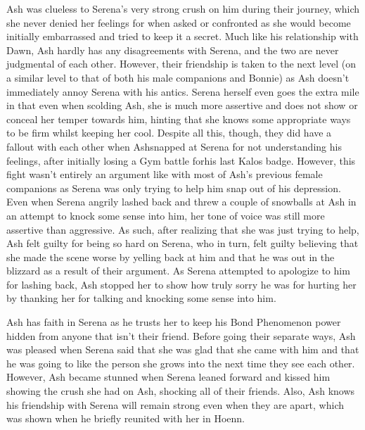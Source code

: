 \documentclass[a4paper,12pt]{article}
\begin{document}
Ash was clueless to Serena's very strong crush on him during their journey, which she never denied her feelings for when asked or confronted as she would become initially embarrassed and tried to keep it a secret. Much like his relationship with Dawn, Ash hardly has any disagreements with Serena, and the two are never judgmental of each other. However, their friendship is taken to the next level (on a similar level to that of both his male companions and Bonnie) as Ash doesn't immediately annoy Serena with his antics. Serena herself even goes the extra mile in that even when scolding Ash, she is much more assertive and does not show or conceal her temper towards him, hinting that she knows some appropriate ways to be firm whilst keeping her cool. Despite all this, though, they did have a fallout with each other when Ashsnapped at Serena for not understanding his feelings, after initially losing a Gym battle forhis last Kalos badge. However, this fight wasn't entirely an argument like with most of Ash's previous female companions as Serena was only trying to help him snap out of his depression. Even when Serena angrily lashed back and threw a couple of snowballs at Ash in an attempt to knock some sense into him, her tone of voice was still more assertive than aggressive. As such, after realizing that she was just trying to help, Ash felt guilty for being so hard on Serena, who in turn, felt guilty believing that she made the scene worse by yelling back at him and that he was out in the blizzard as a result of their argument. As Serena attempted to apologize to him for lashing back, Ash stopped her to show how truly sorry he was for hurting her by thanking her for talking and knocking some sense into him.\\ \par \vspace{0.5cm}

Ash has faith in Serena as he trusts her to keep his Bond Phenomenon power hidden from anyone that isn't their friend. Before going their separate ways, Ash was pleased when Serena said that she was glad that she came with him and that he was going to like the person she grows into the next time they see each other. However, Ash became stunned when Serena leaned forward and kissed him showing the crush she had on Ash, shocking all of their friends. Also, Ash knows his friendship with Serena will remain strong even when they are apart, which was shown when he briefly reunited with her in Hoenn.\\ \par \vspace{0.5cm}
\end{document}
